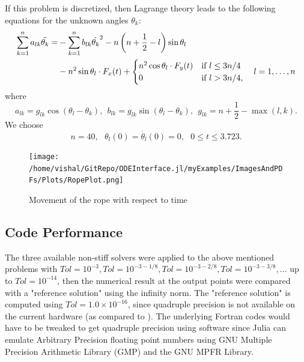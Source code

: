 \documentclass[notitlepage,12pt]{article}
\begin{document}
If this problem is discretized, then Lagrange theory leads to the following equations for the unknown angles $\theta_k$:
\begin{equation}
\begin{aligned}
\sum _{k=1}^n a_{lk} \ddot{\theta_k} = &-\sum _{k=1}^n b_{lk} \dot{\theta_k}^2 -n\left(n+\frac{1}{2} -l \right)\sin{\theta_l}\\
&-n^2\sin{\theta_l}\cdot F_x(t) + \begin{cases}
               n^2\cos{\theta_l}\cdot F_y(t) &\textnormal{if}\ l\leq 3n/4\\
               0 &\textnormal{if}\ l > 3n/4,
            \end{cases} \ \ \  l = 1,\ldots,n
\end{aligned}
\end{equation}
where
\begin{equation}
	a_{lk} = g_{lk}\cos{(\theta_l -\theta_k)}, \ \ b_{lk} = g_{lk}\sin{(\theta_l -\theta_k)},\ \ g_{lk} = n+\frac{1}{2} - \max{(l,k)}.
\end{equation}
We choose
\begin{equation}
	n=40, \ \ \ \theta_l(0) = \dot{\theta_l}(0) = 0, \ \ \ 0 \leq t \leq 3.723.
\end{equation}

\begin{figure}[H]
\centering
\texttt{[image: /home/vishal/GitRepo/ODEInterface.jl/myExamples/ImagesAndPDFs/Plots/RopePlot.png]}
\caption{Movement of the rope with respect to time}
\label{fig:rope}
\end{figure}

\newpage

\subsection{Code Performance}
\label{sec:codePerfNonStiff}
The three available non-stiff solvers were applied to the above mentioned problems with $Tol = 10^{-3} , Tol =
10^{-3-1/8} , Tol = 10^{-3-2/8}, Tol = 10^{-3-3/8},\ldots$ up to $Tol = 10^{-14}$, then the numerical result at the output points were compared with a "reference solution" using the infinity norm. The "reference solution" is computed using $Tol=1.0\times 10^{-16}$, since quadruple precision is not available on the current hardware (as compared to \cite{nonStiff}). The underlying Fortran codes would have to be tweaked to get quadruple precision using software since Julia can emulate Arbitrary Precision floating point numbers using GNU Multiple Precision Arithmetic Library (GMP) and the GNU MPFR Library.
\end{document}
